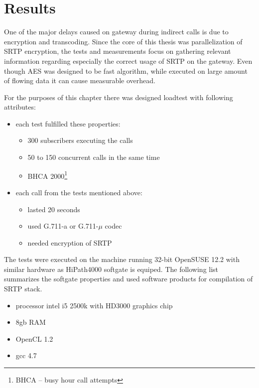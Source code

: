 \chapter{Results}\label{chapter:results}
One of the major delays caused on gateway during indirect calls is due to
encryption and transcoding. Since the core of this thesis was parallelization
of SRTP encryption, the tests and measurements focus on gathering relevant
information regarding especially the correct usage of SRTP on the gateway. Even
though AES was designed to be fast algorithm, while executed on large amount of
flowing data it can cause measurable overhead.

For the purposes of this chapter there was designed loadtest with following
attributes:
\begin{itemize}
\item each test fulfilled these properties:
\vspace{-0.5em}
\begin{itemize}
\item 300 subscribers executing the calls
\item 50 to 150 concurrent calls in the same time\cite{hp4k}
\item BHCA 2000\footnote{ BHCA -- busy hour call attempts}
\end{itemize}
\item each call from the tests mentioned above:
\vspace{-0.5em}
\begin{itemize}
\item lasted 20 seconds
\item used G.711-a or G.711-$\mu$ codec
\item needed encryption of SRTP
\end{itemize}
\end{itemize}


The tests were executed on the machine running 32-bit OpenSUSE 12.2 with similar
hardware as HiPath4000 softgate is equiped. The following list summarizes the
softgate properties and used software products for compilation of SRTP stack.
\begin{itemize}
\item processor intel i5 2500k with HD3000 graphics chip
\item 8gb RAM
\item OpenCL 1.2
\item gcc 4.7
\end{itemize}
 
